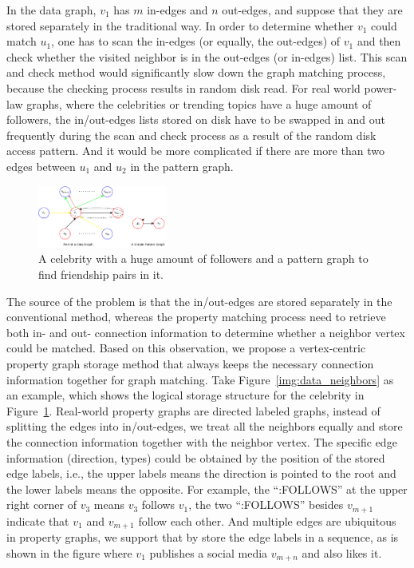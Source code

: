 In the data graph, $v_1$ has $m$ in-edges and $n$ out-edges, and suppose that they are stored separately in the traditional way.
In order to determine whether $v_1$ could match $u_1$,
one has to scan the in-edges (or equally, the out-edges) of $v_1$ and then check whether the visited neighbor is in the out-edges (or in-edges) list.
This scan and check method would significantly slow down the graph matching process,
because the checking process results in random disk read.
For real world power-law graphs, where the celebrities or trending topics have a huge amount of followers,
the in/out-edges lists stored on disk have to be swapped in and out frequently during the scan and check process as a result of the random disk access pattern.
And it would be more complicated if there are more than two edges between $u_1$ and $u_2$ in the pattern graph.
\begin{figure}[ht]
  \centering
  \includegraphics[width=0.38\textwidth]{img/celebrity_star.pdf}
  \caption{A celebrity with a huge amount of followers and a pattern graph to find friendship pairs in it.}\label{img:celebrity_star}
\end{figure}

The source of the problem is that the in/out-edges are stored separately in the conventional method,
whereas the property matching process need to retrieve both in- and out- connection information to determine whether a neighbor vertex could be matched.
Based on this observation, we propose a vertex-centric property graph storage method that always keeps the necessary connection information together for graph matching.
Take Figure~\ref{img:data_neighbors} as an example, which shows the logical storage structure for the celebrity in Figure~\ref{img:celebrity_star}.
Real-world property graphs are directed labeled graphs, instead of splitting the edges into in/out-edges,
we treat all the neighbors equally and store the connection information together with the neighbor vertex.
The specific edge information (direction, types) could be obtained by the position of the stored edge labels, i.e.,
the upper labels means the direction is pointed to the root and the lower labels means the opposite.
For example, the ``:FOLLOWS'' at the upper right corner of $v_3$ means $v_3$ follows $v_1$,
the two ``:FOLLOWS'' besides $v_{m+1}$ indicate that $v_1$ and $v_{m+1}$ follow each other.
And multiple edges are ubiquitous in property graphs, we support that by store the edge labels in a sequence,
as is shown in the figure where $v_1$ publishes a social media $v_{m+n}$ and also likes it.

